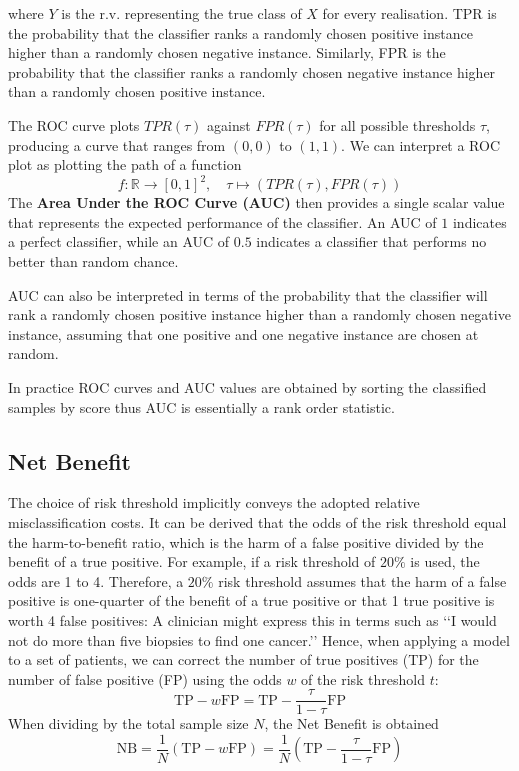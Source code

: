 where $Y$ is the r.v. representing the true class of $X$ for every realisation. 
TPR is the probability that the classifier ranks a randomly chosen positive instance higher than a randomly chosen negative instance. 
Similarly, FPR is the probability that the classifier ranks a randomly chosen negative instance higher than a randomly chosen positive instance.
    
The ROC curve plots $TPR(\tau)$ against $FPR(\tau)$ for all possible thresholds $\tau$, producing a curve that ranges from $(0,0)$ to $(1,1)$.
We can interpret a ROC plot as plotting the path of a function
\[
	f: \mathbb{R} \to [0,1]^2, \quad  \tau \mapsto (TPR(\tau), FPR(\tau))
\]
The \textbf{Area Under the ROC Curve (AUC)} then provides a single scalar value that represents the expected performance of the classifier.
An AUC of $1$ indicates a perfect classifier, while an AUC of $0.5$ indicates a classifier that performs no better than random chance.

AUC can also be interpreted in terms of the probability that the classifier will rank a randomly chosen positive instance higher than a randomly chosen negative instance,
assuming that one positive and one negative instance are chosen at random.

In practice ROC curves and AUC values are obtained by sorting the classified samples by score thus AUC is essentially a rank order statistic.

	
	
\subsection{Net Benefit}
	The choice of risk threshold implicitly conveys the adopted relative misclassification costs. 
	It can be derived that the odds of the risk threshold equal the harm-to-benefit ratio, which is the harm of a false positive divided by the benefit of a true positive.
	For example, if a risk threshold of $20\%$ is used, the odds are 1 to 4. 
	Therefore, a $20\%$ risk threshold assumes that the harm of a false positive is one-quarter of the benefit of a true positive or that 1 true positive is worth 4 false positives: 
	A clinician might express this in terms such as ‘‘I would not do more than five biopsies to find one cancer.’’ 
	Hence, when applying a model to a set of patients,
	we can correct the number of true positives (TP) for the number of false positive (FP) using the odds $w$ of the risk threshold $t$: 
	\[
		\text{TP} - w \text{FP} = \text{TP} - \frac{\tau}{1-\tau} \text{FP}
	\]
	When dividing by the total sample size $N$, the Net Benefit is obtained
	\[
		\text{NB} = \frac{1}{N} (\text{TP} - w \text{FP}) = \frac{1}{N} (\text{TP} - \frac{\tau}{1-\tau} \text{FP})
	\]
	
